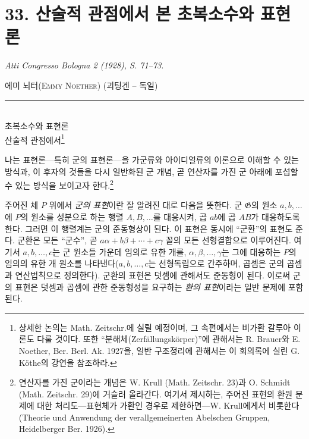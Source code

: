 
\section*{33. 산술적 관점에서 본 초복소수와 표현론}
\emph{Atti Congresso Bologna 2 (1928), S. 71--73.}

\begingroup
\renewcommand{\thefootnote}{(\arabic{footnote})}

\begin{center}
\textsc{에미 뇌터(Emmy Noether)} (괴팅겐 -- 독일)\\[-0.1em]
\rule{3em}{0.4pt}\\[0.8em]
\textsc{초복소수와 표현론}\\
\textsc{산술적 관점에서}\footnote{상세한 논의는 Math. Zeitschr.에 실릴 예정이며, 그 속편에서는 비가환 갈루아 이론도 다룰 것이다. 또한 ``분해체(Zerfällungskörper)''에 관해서는 R. Brauer와 E. Noether, Ber. Berl. Ak. 1927을, 일반 구조정리에 관해서는 이 회의록에 실린 G. Köthe의 강연을 참조하라.}
\end{center}

나는 표현론---특히 군의 표현론---을 가군류와 아이디얼류의 이론으로 이해할 수 있는 방식과, 이 후자의 것들을 다시 일반화된 군 개념, 곧 연산자를 가진 군 아래에 포섭할 수 있는 방식을 보이고자 한다.\footnote{연산자를 가진 군이라는 개념은 W. Krull (Math. Zeitschr. 23)과 O. Schmidt (Math. Zeitschr. 29)에 거슬러 올라간다. 여기서 제시하는, 주어진 표현의 환원 문제에 대한 처리도---표현체가 가환인 경우로 제한하면---W. Krull에게서 비롯한다(Theorie und Anwendung der verallgemeinerten Abelschen Gruppen, Heidelberger Ber. 1926).}

주어진 체 $P$ 위에서 \emph{군의 표현}이란 잘 알려진 대로 다음을 뜻한다. 군 $\mathfrak{G}$의 원소 $a,b,\ldots$에 $P$의 원소를 성분으로 하는 행렬 $A,B,\ldots$를 대응시켜, 곱 $ab$에 곱 $AB$가 대응하도록 한다. 그러면 이 행렬계는 군의 준동형상이 된다. 이 표현은 동시에 ``군환''의 표현도 준다. 군환은 모든 ``군수'', 곧 $a\alpha+b\beta+\cdots+c\gamma$ 꼴의 모든 선형결합으로 이루어진다. 여기서 $a,b,\ldots,c$는 군 원소들 가운데 임의로 유한 개를, $\alpha,\beta,\ldots,\gamma$는 그에 대응하는 $P$의 임의의 유한 개 원소를 나타낸다($a,b,\ldots,c$는 선형독립으로 간주하며, 곱셈은 군의 곱셈과 연산법칙으로 정의한다). 군환의 표현은 덧셈에 관해서도 준동형이 된다. 이로써 군의 표현은 덧셈과 곱셈에 관한 준동형성을 요구하는 \emph{환의 표현}이라는 일반 문제에 포함된다.

